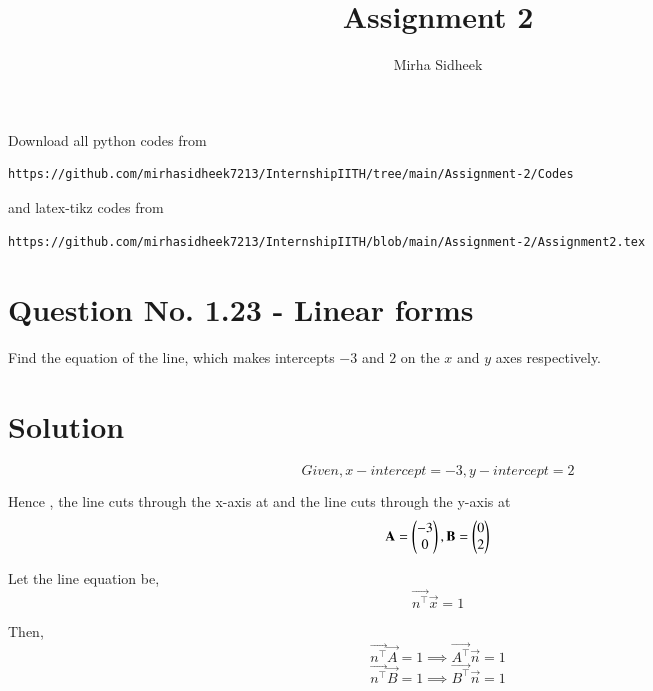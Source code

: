 \documentclass[journal,12pt,twocolumn]{IEEEtran}
\begin{document}
     \def\centbox#1{\makebox[0in]{#1}}
     \def\topbox#1{\raisebox{-\baselineskip}[0in][0in]{#1}}
     \def\midbox#1{\raisebox{-0.5\baselineskip}[0in][0in]{#1}}
\vspace{3cm}
\title{Assignment 2}
\author{Mirha Sidheek}
\maketitle
\newpage
\bigskip
\renewcommand{\thefigure}{\theenumi}
\renewcommand{\thetable}{\theenumi}
Download all python codes from 
\begin{lstlisting}
https://github.com/mirhasidheek7213/InternshipIITH/tree/main/Assignment-2/Codes
\end{lstlisting}

%
and latex-tikz codes from 
%
\begin{lstlisting}
https://github.com/mirhasidheek7213/InternshipIITH/blob/main/Assignment-2/Assignment2.tex
\end{lstlisting}

\section{Question No. 1.23 - Linear forms}

 Find the equation of the line, which makes intercepts $-3$ and $2$ on the $x$ and $y$ axes respectively.
%
\section{Solution}
\begin{equation}
Given, x-intercept=-3, y-intercept = 2
\end{equation}

Hence , the line cuts through the x-axis at  and the line cuts through the y-axis at 
\begin{equation}
\mathbf{A} = {\begin{pmatrix}-3\\0\end{pmatrix} , \mathbf{B} = \begin{pmatrix}0\\2\end{pmatrix}}
\end{equation}



Let the line equation be,
\begin{equation}
    \vec{n^\top}\vec{x}=1
\end{equation}

Then,
\begin{equation}
    \vec{n^\top}\vec{A}=1 \implies \vec{A^\top}\vec{n}=1
\end{equation}
\begin{equation}
\vec{n^\top}\vec{B}=1 \implies \vec{B^\top}\vec{n}=1
\end{equation}
\end{document}
